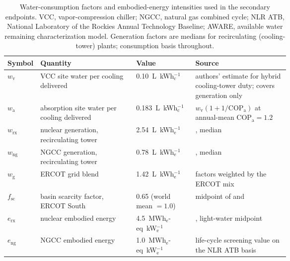\begin{table}[pos=t]
\centering
\caption{Water-consumption factors and embodied-energy intensities used in the secondary endpoints. VCC, vapor-compression chiller; NGCC, natural gas combined cycle; NLR ATB, National Laboratory of the Rockies Annual Technology Baseline; AWARE, available water remaining characterization model. Generation factors are medians for recirculating (cooling-tower) plants; consumption basis throughout.}
\label{tab:endpoint_factors}
\renewcommand{\arraystretch}{1.08}
\begin{tabularx}{\linewidth}{@{}L{0.11\linewidth}L{0.34\linewidth}L{0.21\linewidth}Y@{}}
\toprule
Symbol & Quantity & Value & Source \\
\midrule
$w_\mathrm{v}$  & VCC site water per cooling delivered & 0.10~L~kWh$_\mathrm{c}^{-1}$ & authors' estimate for hybrid cooling-tower duty; \citet{macknick2012water} covers generation only \\
$w_\mathrm{a}$  & absorption site water per cooling delivered & 0.183~L~kWh$_\mathrm{c}^{-1}$ & $w_\mathrm{v}(1+1/\mathrm{COP}_\mathrm{a})$ at annual-mean $\mathrm{COP}_\mathrm{a}=1.2$ \\
$w_\mathrm{rx}$ & nuclear generation, recirculating tower & 2.54~L~kWh$_\mathrm{e}^{-1}$ & \citet{macknick2012water}, median \\
$w_\mathrm{ng}$ & NGCC generation, recirculating tower & 0.78~L~kWh$_\mathrm{e}^{-1}$ & \citet{macknick2012water}, median \\
$w_\mathrm{g}$  & ERCOT grid blend & 1.42~L~kWh$_\mathrm{e}^{-1}$ & \citet{macknick2012water} factors weighted by the ERCOT mix \\
$f_\mathrm{sc}$ & basin scarcity factor, ERCOT South & 0.65 (world mean $=1.0$) & midpoint of \citet{wri2023aqueduct} and \citet{boulay2018aware} \\
$e_\mathrm{rx}$ & nuclear embodied energy & 4.5~MWh$_\mathrm{e}$-eq~kW$_\mathrm{e}^{-1}$ & \citet{lenzen2008nuclear}, light-water midpoint \\
$e_\mathrm{ng}$ & NGCC embodied energy & 1.0~MWh$_\mathrm{e}$-eq~kW$_\mathrm{e}^{-1}$ & life-cycle screening value on the NLR ATB basis \citep{atb2024nuclear} \\
\bottomrule
\end{tabularx}
\end{table}
